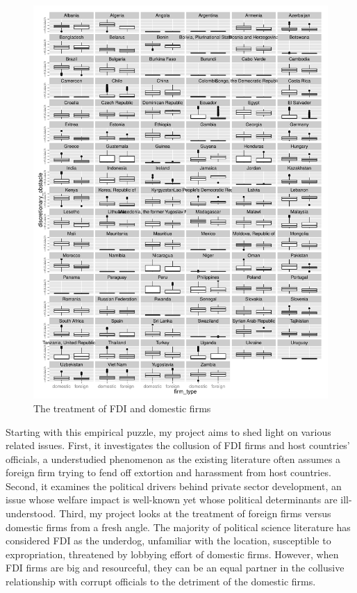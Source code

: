 \documentclass[12pt]{article}
\begin{document}
\begin{figure}[!ht]
\includegraphics[width=\textwidth, height=\textheight,keepaspectratio]{../figure/fdi_domestic_treatment}
\caption{The treatment of FDI and domestic firms}
\label{fig:fdi_domestic_treatment}
\end{figure}

Starting with this empirical puzzle, my project aims to shed light on various related issues. First, it investigates the collusion of FDI firms and host countries' officials, a understudied phenomenon as the existing literature often assumes a foreign firm trying to fend off extortion and harassment from host countries. Second, it examines the political drivers behind private sector development, an issue whose welfare impact is well-known yet whose political determinants are ill-understood. Third, my project looks at the treatment of foreign firms versus domestic firms from a fresh angle. The majority of political science literature has considered FDI as the underdog, unfamiliar with the location, susceptible to expropriation, threatened by lobbying effort of domestic firms. However, when FDI firms are big and resourceful, they can be an equal partner in the collusive relationship with corrupt officials to the detriment of the domestic firms.
\end{document}
